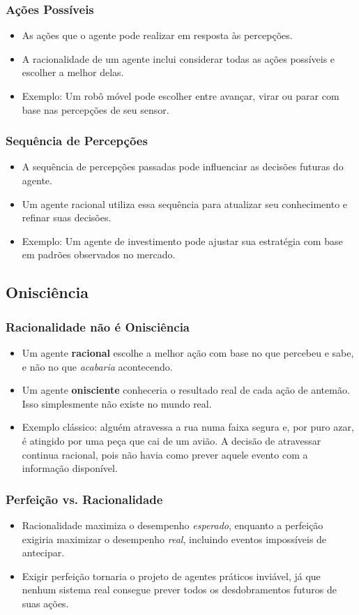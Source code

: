 \documentclass{beamer}
\begin{document}
\begin{frame}
\frametitle{Ações Possíveis}
\begin{itemize}
    \item As ações que o agente pode realizar em resposta às percepções.
    \item A racionalidade de um agente inclui considerar todas as ações possíveis e escolher a melhor delas.
    \item Exemplo: Um robô móvel pode escolher entre avançar, virar ou parar com base nas percepções de seu sensor.
\end{itemize}
\end{frame}

\begin{frame}
\frametitle{Sequência de Percepções}
\begin{itemize}
    \item A sequência de percepções passadas pode influenciar as decisões futuras do agente.
    \item Um agente racional utiliza essa sequência para atualizar seu conhecimento e refinar suas decisões.
    \item Exemplo: Um agente de investimento pode ajustar sua estratégia com base em padrões observados no mercado.
\end{itemize}
\end{frame}

\subsection{Onisciência}
\begin{frame}
\frametitle{Racionalidade não é Onisciência}
\begin{itemize}
    \item Um agente \textbf{racional} escolhe a melhor ação com base no que percebeu e sabe, e não no que \textit{acabaria} acontecendo.
    \item Um agente \textbf{onisciente} conheceria o resultado real de cada ação de antemão. Isso simplesmente não existe no mundo real.
    \item Exemplo clássico: alguém atravessa a rua numa faixa segura e, por puro azar, é atingido por uma peça que cai de um avião. A decisão de atravessar continua racional, pois não havia como prever aquele evento com a informação disponível.
\end{itemize}
\end{frame}

\begin{frame}
\frametitle{Perfeição vs. Racionalidade}
\begin{itemize}
    \item Racionalidade maximiza o desempenho \textit{esperado}, enquanto a perfeição exigiria maximizar o desempenho \textit{real}, incluindo eventos impossíveis de antecipar.
    \item Exigir perfeição tornaria o projeto de agentes práticos inviável, já que nenhum sistema real consegue prever todos os desdobramentos futuros de suas ações.
\end{itemize}
\end{frame}
\end{document}
